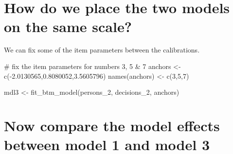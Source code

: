\documentclass[
  letterpaper,
  DIV=11,
  numbers=noendperiod]{scrreprt}
\newenvironment{Shaded}{\begin{snugshade}}{\end{snugshade}}
\newcommand{\CommentTok}[1]{\textcolor[rgb]{0.37,0.37,0.37}{#1}}
\newcommand{\FloatTok}[1]{\textcolor[rgb]{0.68,0.00,0.00}{#1}}
\newcommand{\FunctionTok}[1]{\textcolor[rgb]{0.28,0.35,0.67}{#1}}
\newcommand{\NormalTok}[1]{\textcolor[rgb]{0.00,0.23,0.31}{#1}}
\newcommand{\OtherTok}[1]{\textcolor[rgb]{0.00,0.23,0.31}{#1}}
\newcommand{\SpecialCharTok}[1]{\textcolor[rgb]{0.37,0.37,0.37}{#1}}
\newcommand{\StringTok}[1]{\textcolor[rgb]{0.13,0.47,0.30}{#1}}
\begin{document}
\hypertarget{how-do-we-place-the-two-models-on-the-same-scale}{%
\section{How do we place the two models on the same
scale?}\label{how-do-we-place-the-two-models-on-the-same-scale}}

We can fix some of the item parameters between the calibrations.

\begin{Shaded}
\begin{Highlighting}[]
\CommentTok{\# fix the item parameters for numbers 3, 5 \& 7}
\NormalTok{anchors }\OtherTok{\textless{}{-}} \FunctionTok{c}\NormalTok{(}\SpecialCharTok{{-}}\FloatTok{2.0130565}\NormalTok{,}\FloatTok{0.8080052}\NormalTok{,}\FloatTok{3.5605796}\NormalTok{)}
\FunctionTok{names}\NormalTok{(anchors) }\OtherTok{\textless{}{-}} \FunctionTok{c}\NormalTok{(}\StringTok{\textquotesingle{}3\textquotesingle{}}\NormalTok{,}\StringTok{\textquotesingle{}5\textquotesingle{}}\NormalTok{,}\StringTok{\textquotesingle{}7\textquotesingle{}}\NormalTok{)}

\NormalTok{mdl3 }\OtherTok{\textless{}{-}} \FunctionTok{fit\_btm\_model}\NormalTok{(persons\_2, decisions\_2, anchors)}
\end{Highlighting}
\end{Shaded}

\hypertarget{now-compare-the-model-effects-between-model-1-and-model-3}{%
\section{Now compare the model effects between model 1 and model
3}\label{now-compare-the-model-effects-between-model-1-and-model-3}}
\end{document}
